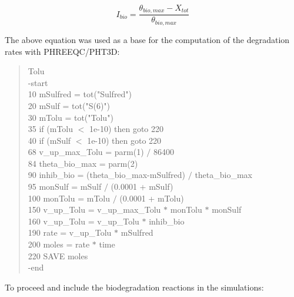 \begin{equation}
{ I_{bio} = \frac{\theta_{bio,max} - X_{tot}}{\theta_{bio,max}} }
\label{eq:lambda_diff}
\end{equation}
%

The above equation was used as a base for the computation 
of the degradation rates with PHREEQC/PHT3D: 

{\color{red}
\begin{quote}
Tolu \\
  -start \\
   10 mSulfred  = tot("Sulfred")  \\
   20 mSulf     = tot("S(6)")  \\
   30 mTolu     = tot("Tolu")  \\
   35 if (mTolu  $<$ 1e-10) then goto 220  \\
   40 if (mSulf  $<$ 1e-10) then goto 220  \\
   68 v\_up\_max\_Tolu = parm(1) $/$ 86400  \\
   84 theta\_bio\_max  = parm(2)  \\
   90 inhib\_bio = (theta\_bio\_max-mSulfred) $/$ theta\_bio\_max  \\
   95 monSulf = mSulf $/$ (0.0001 + mSulf)  \\
  100 monTolu = mTolu $/$ (0.0001 + mTolu)  \\
  150 v\_up\_Tolu = v\_up\_max\_Tolu $*$ monTolu $*$ monSulf  \\
  160 v\_up\_Tolu = v\_up\_Tolu $*$ inhib\_bio \\
  190 rate = v\_up\_Tolu $*$ mSulfred  \\
  200 moles = rate $*$ time  \\
  220 SAVE moles  \\
 -end  \\
\end{quote}
}

To proceed and include the biodegradation reactions in the simulations:

